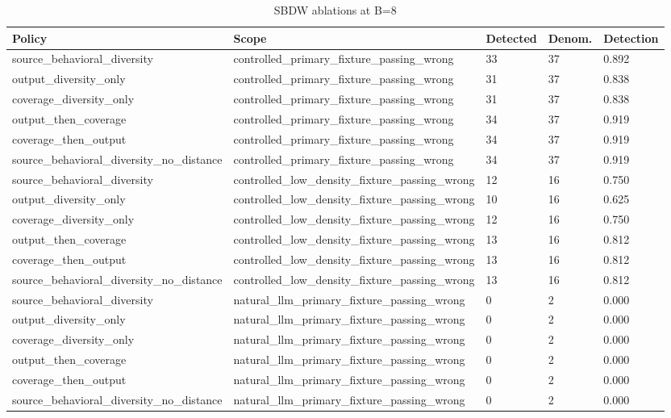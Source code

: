 \begin{table}[t]
\centering
\small
\begin{tabular}{lllll}
\toprule
Policy & Scope & Detected & Denom. & Detection \\
\midrule
source\_behavioral\_diversity & controlled\_primary\_fixture\_passing\_wrong & 33 & 37 & 0.892 \\
output\_diversity\_only & controlled\_primary\_fixture\_passing\_wrong & 31 & 37 & 0.838 \\
coverage\_diversity\_only & controlled\_primary\_fixture\_passing\_wrong & 31 & 37 & 0.838 \\
output\_then\_coverage & controlled\_primary\_fixture\_passing\_wrong & 34 & 37 & 0.919 \\
coverage\_then\_output & controlled\_primary\_fixture\_passing\_wrong & 34 & 37 & 0.919 \\
source\_behavioral\_diversity\_no\_distance & controlled\_primary\_fixture\_passing\_wrong & 34 & 37 & 0.919 \\
source\_behavioral\_diversity & controlled\_low\_density\_fixture\_passing\_wrong & 12 & 16 & 0.750 \\
output\_diversity\_only & controlled\_low\_density\_fixture\_passing\_wrong & 10 & 16 & 0.625 \\
coverage\_diversity\_only & controlled\_low\_density\_fixture\_passing\_wrong & 12 & 16 & 0.750 \\
output\_then\_coverage & controlled\_low\_density\_fixture\_passing\_wrong & 13 & 16 & 0.812 \\
coverage\_then\_output & controlled\_low\_density\_fixture\_passing\_wrong & 13 & 16 & 0.812 \\
source\_behavioral\_diversity\_no\_distance & controlled\_low\_density\_fixture\_passing\_wrong & 13 & 16 & 0.812 \\
source\_behavioral\_diversity & natural\_llm\_primary\_fixture\_passing\_wrong & 0 & 2 & 0.000 \\
output\_diversity\_only & natural\_llm\_primary\_fixture\_passing\_wrong & 0 & 2 & 0.000 \\
coverage\_diversity\_only & natural\_llm\_primary\_fixture\_passing\_wrong & 0 & 2 & 0.000 \\
output\_then\_coverage & natural\_llm\_primary\_fixture\_passing\_wrong & 0 & 2 & 0.000 \\
coverage\_then\_output & natural\_llm\_primary\_fixture\_passing\_wrong & 0 & 2 & 0.000 \\
source\_behavioral\_diversity\_no\_distance & natural\_llm\_primary\_fixture\_passing\_wrong & 0 & 2 & 0.000 \\
\bottomrule
\end{tabular}
\caption{SBDW ablations at B=8}
\end{table}
